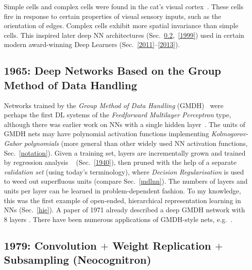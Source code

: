 \documentclass[letterpaper]{article}
\begin{document}
\begin{sloppypar}
Simple cells and complex cells were found in the cat's 
visual cortex~\citep[e.g.,][]{Hubel:62,wiesel:1959}.
These cells fire in response to certain properties of visual sensory inputs, 
such as the orientation of edges. Complex cells exhibit more spatial invariance than simple cells.
This  inspired later deep NN architectures 
(Sec.~\ref{1979},~\ref{1999}) used in certain modern award-winning Deep Learners (Sec.~\ref{2011}--\ref{2013}).



\subsection{1965: Deep Networks Based on the Group Method of Data Handling}
\label{1965}

Networks trained by the {\em Group Method of Data Handling} (GMDH)~\citep{ivakhnenko1965,ivakhnenko1967,ivakhnenko1968,ivakhnenko1971} 
were perhaps the first DL systems of
the {\em Feedforward Multilayer Perceptron} type,
although there was earlier work on NNs with a single hidden layer~\citep[e.g.,][]{joseph1961,viglione1970}.
The units of GMDH nets may have polynomial activation functions implementing 
{\em Kol\-mo\-go\-rov-Gabor polynomials} (more general than other widely used NN activation functions, Sec.~\ref{notation}).
Given a training set, layers are incrementally grown and trained by regression analysis ~\citep[e.g.,][]{legendre1805,gauss1809,gauss1821} (Sec.~\ref{1940}), 
then pruned with the help of a
separate {\em validation set} (using today's terminology), where
{\em Decision Regularisation} is used to weed out 
superfluous units (compare Sec.~\ref{mdlnn}). The numbers of layers and units per layer can be learned in
problem-dependent fashion.
To my knowledge, this was the first example of open-ended, hierarchical 
representation learning  in NNs (Sec.~\ref{hie}).
A paper of 1971 already described a deep GMDH network with 8 layers
\citep{ivakhnenko1971}.
There have been numerous applications of GMDH-style nets, e.g.~\citep{ikeda1976,farlow1984,madala1994,ivakhnenko1995,kondo1998,kordik2003,witczak2006,kondo2008}. 


\subsection{1979:  Convolution $+$ Weight Replication $+$ Subsampling (Neocognitron)}
\label{1979}


\end{sloppypar}
\end{document}

